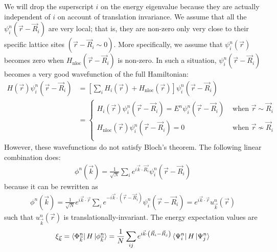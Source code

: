 \documentclass[12pt]{article}
\numberwithin{equation}{section}
\begin{document}
We will drop the superscript $i$ on the energy eigenvalue because they are actually independent of $i$ on account of translation invariance.
We assume that all the \(\psi_i^n(\vec r - \vec R_i)\) are very local; that is, they are non-zero only very close to their specific lattice sites \(\left( \vec r - \vec R_i \sim 0 \right) \). More specifically, we assume that \(\psi_i^n(\vec r)\) becomes zero when $H_\text{nloc}(\vec r - \vec R_i)$ is non-zero. In such a situation, \(\psi_i^n(\vec r - \vec R_i)\) becomes a very good wavefunction of the full Hamiltonian:
\begin{equation}\begin{aligned}
	H(\vec r)\psi_i^n(\vec r - \vec R_i) &= \left[\sum_i H_i(\vec r) + H_\text{nloc}(\vec r)\right] \psi_i^n(\vec r - \vec R_i)\\
					   &= \begin{cases}
						   H_i(\vec r)\psi_i^n(\vec r - \vec R_i) = E^n\psi_i^n(\vec r - \vec R_i) & \text{ when }\vec r \sim \vec R_i\\
						   H_\text{nloc}(\vec r) \psi_i^n(\vec r - \vec R_i) = 0 & \text{ when }\vec r \nsim \vec R_i\\
	\end{cases}
\end{aligned}\end{equation}
However, these wavefunctions do not satisfy Bloch's theorem. The following linear combination does:
\begin{equation}\begin{aligned}
	\phi^n(\vec k) = \frac{1}{\sqrt N}\sum_{i}e^{i \vec{k}\cdot\vec{R_i}}\psi^n_i(\vec r - \vec R_i)
\end{aligned}\end{equation}
because it can be rewritten as
\begin{equation}\begin{aligned}
	\phi^n(\vec k) = \frac{1}{\sqrt N}e^{i \vec{k}\cdot\vec{r}}\sum_{i}e^{-i \vec{k}\cdot\left(\vec r-\vec R_i\right)}\psi^n_i(\vec r - \vec R_i) = e^{i \vec{k}\cdot\vec{r}} u^n_{\vec k}(\vec r)
\end{aligned}\end{equation}
such that \(u^n_{\vec k}(\vec r)\) is translationally-invariant. The energy expectation values are
\begin{equation}\begin{aligned}
	\xi_{\vec k} = \bra{\Phi^n_{\vec k}}H\ket{\phi^n_{\vec k}} = \frac{1}{N}\sum_{ij}e^{i \vec k \cdot\left(\vec R_i - \vec R_j\right)}\bra{\Psi^n_i}H\ket{\Psi^n_j}
\end{aligned}\end{equation}
\end{document}
